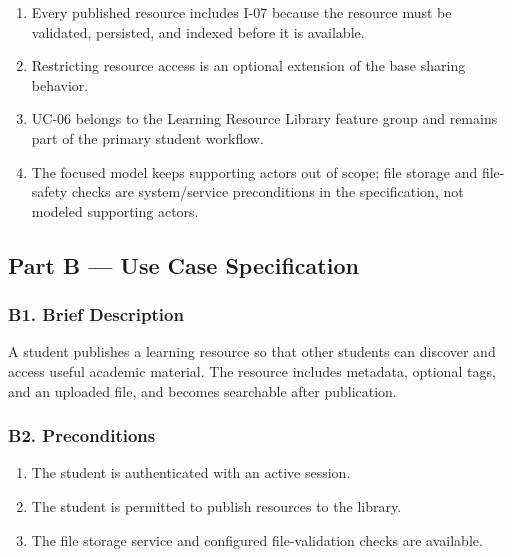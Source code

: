 \documentclass[12pt]{article}
\begin{document}
\begin{enumerate}
\item Every published resource includes I-07 because the resource must be validated, persisted, and indexed before it is available.
\item Restricting resource access is an optional extension of the base sharing behavior.
\item UC-06 belongs to the Learning Resource Library feature group and remains part of the primary student workflow.
\item The focused model keeps supporting actors out of scope; file storage and file-safety checks are system/service preconditions in the specification, not modeled supporting actors.
\end{enumerate}
\par\medskip

\hypertarget{sec:part-b-use-case-specification}{}
\subsection*{Part B --- Use Case Specification}
\par\medskip

\hypertarget{sec:b1-brief-description}{}
\subsubsection*{B1. Brief Description}
\par\medskip

A student publishes a learning resource so that other students can discover and access useful academic material. The resource includes metadata, optional tags, and an uploaded file, and becomes searchable after publication.
\par\medskip

\hypertarget{sec:b2-preconditions}{}
\subsubsection*{B2. Preconditions}
\par\medskip

\begin{enumerate}
\item The student is authenticated with an active session.
\item The student is permitted to publish resources to the library.
\item The file storage service and configured file-validation checks are available.
\end{enumerate}
\par\medskip
\end{document}
